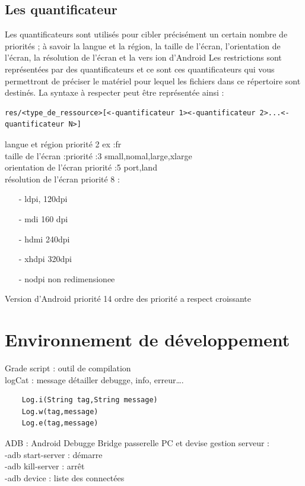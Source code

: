 \subsection{Les quantificateur}
Les  quantificateurs  sont utilisés  pour cibler précisément un certain nombre de priorités  ; à savoir la langue et la région, la taille de l'écran, l'orientation de l'écran, la résolution de l'écran et la vers ion d'Android Les  restrictions  sont représentées  par des  quantificateurs  et ce sont ces  quantificateurs  qui vous  permettront de préciser le matériel pour lequel les fichiers  dans  ce répertoire sont destinés. La syntaxe à respecter peut être représentée ainsi :
\begin{lstlisting}
res/<type_de_ressource>[<-quantificateur 1><-quantificateur 2>...<-quantificateur N>]  
\end{lstlisting}
langue et région priorité 2 ex :fr\\
taille de l’écran :priorité :3 small,nomal,large,xlarge\\
orientation de  l’écran priorité :5 port,land\\
résolution de l’écran  priorité 8 :	
\begin{itemize}
\item[-]ldpi, 120dpi
\item[-]mdi 160 dpi
\item[-]hdmi 240dpi
\item[-]xhdpi 320dpi
\item[-]nodpi non redimensionee
\end{itemize}

Version d’Android priorité 14
ordre des priorité a respect croissante 
\section{Environnement de développement }
Grade script : outil de compilation\\
logCat :   message détailler debugge, info, erreur….\\
\begin{lstlisting}
	Log.i(String tag,String message)
	Log.w(tag,message)
	Log.e(tag,message)
\end{lstlisting}
ADB : Android Debugge Bridge passerelle PC et devise gestion serveur :\\
-adb start-server : démarre\\
-adb kill-server : arrêt\\
-adb device : liste des connectées\\
